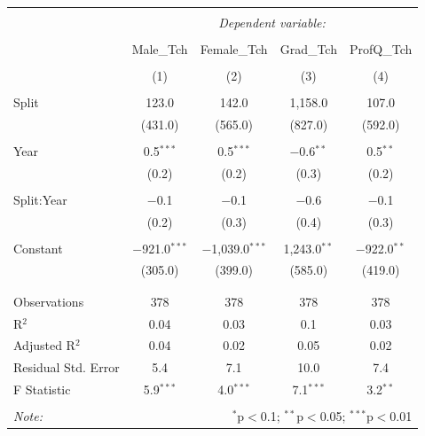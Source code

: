 \documentclass[12pt, a4paper]{article}
\begin{document}
\begin{table}[!htbp] \centering 
  \caption{} 
  \label{} 
\begin{tabular}{@{\extracolsep{5pt}}lcccc} 
\\[-1.8ex]\hline 
\hline \\[-1.8ex] 
 & \multicolumn{4}{c}{\textit{Dependent variable:}} \\ 
\cline{2-5} 
\\[-1.8ex] & Male\_Tch & Female\_Tch & Grad\_Tch & ProfQ\_Tch \\ 
\\[-1.8ex] & (1) & (2) & (3) & (4)\\ 
\hline \\[-1.8ex] 
 Split & 123.0 & 142.0 & 1,158.0 & 107.0 \\ 
  & (431.0) & (565.0) & (827.0) & (592.0) \\ 
  & & & & \\ 
 Year & 0.5$^{***}$ & 0.5$^{***}$ & $-$0.6$^{**}$ & 0.5$^{**}$ \\ 
  & (0.2) & (0.2) & (0.3) & (0.2) \\ 
  & & & & \\ 
 Split:Year & $-$0.1 & $-$0.1 & $-$0.6 & $-$0.1 \\ 
  & (0.2) & (0.3) & (0.4) & (0.3) \\ 
  & & & & \\ 
 Constant & $-$921.0$^{***}$ & $-$1,039.0$^{***}$ & 1,243.0$^{**}$ & $-$922.0$^{**}$ \\ 
  & (305.0) & (399.0) & (585.0) & (419.0) \\ 
  & & & & \\ 
\hline \\[-1.8ex] 
Observations & 378 & 378 & 378 & 378 \\ 
R$^{2}$ & 0.04 & 0.03 & 0.1 & 0.03 \\ 
Adjusted R$^{2}$ & 0.04 & 0.02 & 0.05 & 0.02 \\ 
Residual Std. Error & 5.4 & 7.1 & 10.0 & 7.4 \\ 
F Statistic & 5.9$^{***}$ & 4.0$^{***}$ & 7.1$^{***}$ & 3.2$^{**}$ \\ 
\hline 
\hline \\[-1.8ex] 
\textit{Note:}  & \multicolumn{4}{r}{$^{*}$p$<$0.1; $^{**}$p$<$0.05; $^{***}$p$<$0.01} \\ 
\end{tabular} 
\end{table} %
\end{document}
